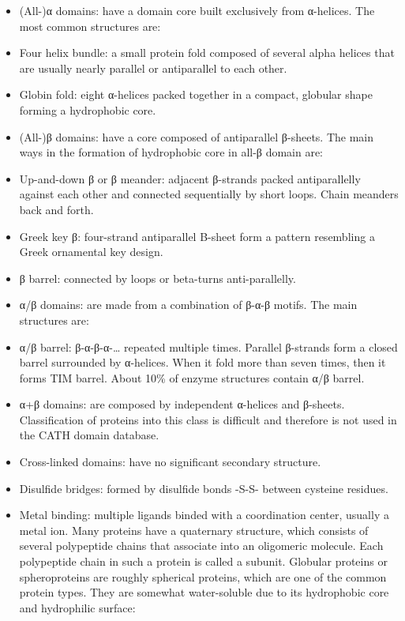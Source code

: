 \documentclass[a4paper,12pt]{report}
\begin{document}
\begin{itemize}
\begin{itemize}
Five major arrangements of a structural domain:
\bit
\item (All-)α domains: have a domain core built exclusively from α-helices. The most common structures are:
\bit
\item Four helix bundle: a small protein fold composed of several alpha helices that are usually nearly parallel or antiparallel to each other.
\item Globin fold: eight α-helices packed together in a compact, globular shape forming a hydrophobic core.
\eit
\item (All-)β domains: have a core composed of antiparallel β-sheets. The main ways in the formation of hydrophobic core in all-β domain are:
\bit
\item Up-and-down β or β meander: adjacent β-strands packed antiparallelly against each other and connected sequentially by short loops. Chain meanders back and forth.
\item Greek key β: four-strand antiparallel B-sheet form a pattern resembling a Greek ornamental key design.
\item β barrel: connected by loops or beta-turns anti-parallelly.
\eit
\item α/β domains: are made from a combination of β-α-β motifs. The main structures are:
\bit
\item α/β barrel: β-α-β-α-… repeated multiple times. Parallel β-strands form a closed barrel surrounded by α-helices. When it fold more than seven times, then it forms TIM barrel. About 10\% of enzyme structures contain α/β barrel.
\eit
\item α+β domains: are composed by independent α-helices and β-sheets. Classification of proteins into this class is difficult and therefore is not used in the CATH domain database.
\item Cross-linked domains: have no significant secondary structure.
\bit
\item Disulfide bridges: formed by disulfide bonds -S-S- between cysteine ​​residues.
\item Metal binding: multiple ligands binded with a coordination center, usually a metal ion.
\eit
\eit
{}
Many proteins have a quaternary structure, which consists of several polypeptide chains that associate into an oligomeric molecule. Each polypeptide chain in such a protein is called a subunit.
Globular proteins or spheroproteins are roughly spherical proteins, which are one of the common protein types. They are somewhat water-soluble due to its hydrophobic core and hydrophilic surface:

\end{itemize}
\end{itemize}
\end{document}
